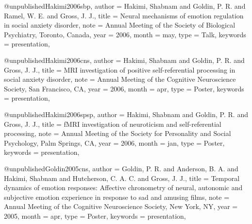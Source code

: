 @unpublished{Hakimi2006sbp,
  author   = {Hakimi, Shabnam and Goldin, P. R. and Ramel, W. E.
              and Gross, J. J.},
  title    = {Neural mechanisms of emotion regulation in social anxiety
              disorder},
  note     = {Annual Meeting of the Society of Biological Psychiatry,
              Toronto, Canada},
  year     = {2006},
  month    = may,
  type     = {Talk},
  keywords = {presentation},
}

@unpublished{Hakimi2006cns,
  author   = {Hakimi, Shabnam and Goldin, P. R. and Gross, J. J.},
  title    = {{MRI} investigation of positive self-referential processing
              in social anxiety disorder},
  note     = {Annual Meeting of the Cognitive Neuroscience Society,
              San Francisco, CA},
  year     = {2006},
  month    = apr,
  type     = {Poster},
  keywords = {presentation},
}

@unpublished{Hakimi2006spsp,
  author   = {Hakimi, Shabnam and Goldin, P. R. and Gross, J. J.},
  title    = {{fMRI} investigation of neuroticism and self-referential
              processing},
  note     = {Annual Meeting of the Society for Personality and Social
              Psychology, Palm Springs, CA},
  year     = {2006},
  month    = jan,
  type     = {Poster},
  keywords = {presentation},
}


@unpublished{Goldin2005cns,
  author   = {Goldin, P. R. and Anderson, B. A. and Hakimi, Shabnam
              and Hutcherson, C. A. C. and Gross, J. J.},
  title    = {Temporal dynamics of emotion responses: Affective chronometry
              of neural, autonomic and subjective emotion experience in
              response to sad and amusing films},
  note     = {Annual Meeting of the Cognitive Neuroscience Society,
              New York, NY},
  year     = {2005},
  month    = apr,
  type     = {Poster},
  keywords = {presentation},
}